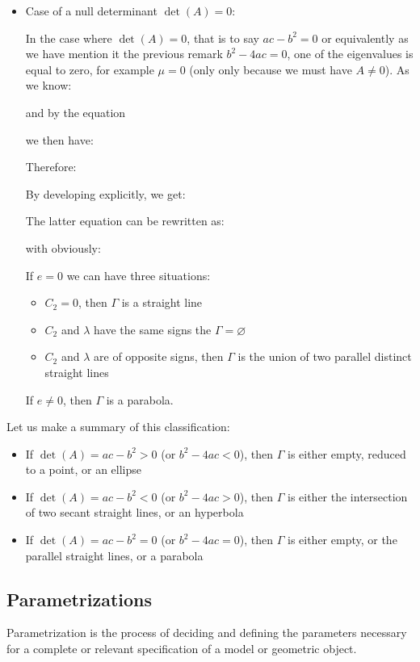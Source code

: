 \begin{itemize}
		\item Case of a null determinant $\det(A)=0$:
		
		In the case where $\det(A)=0$, that is to say $ac-b^2=0$ or equivalently as we have mention it the previous remark $b^2-4ac=0$, one of the eigenvalues is equal to zero, for example $\mu=0$ (only only because we must have $A\neq 0$). As we know:
		
		and by the equation
		
		we then have:
		
		Therefore:
		
		By developing explicitly, we get:
		
		The latter equation can be rewritten as:
		
		with obviously:
		
		If $e=0$ we can have three situations:
		\begin{itemize}
			\item $C_2=0$, then $\Gamma$ is a straight line

			\item $C_2$ and $\lambda$ have the same signs the $\Gamma=\varnothing$

			\item $C_2$ and $\lambda$ are of opposite signs, then $\Gamma$ is the union of two parallel distinct straight lines
		\end{itemize}
		If $e\neq 0$, then $\Gamma$ is a parabola.
	\end{itemize}
	Let us make a summary of this classification:
	\begin{itemize}
		\item If $\det(A)=ac-b^2>0$ (or $b^2-4ac<0$), then $\Gamma$ is either empty, reduced to a point, or an ellipse

		\item If $\det(A)=ac-b^2<0$ (or $b^2-4ac>0$), then $\Gamma$ is either the intersection of two secant straight lines, or an hyperbola

			\item If $\det(A)=ac-b^2=0$ (or $b^2-4ac=0$), then $\Gamma$ is either empty, or the parallel straight lines, or a parabola
	\end{itemize}	

	\pagebreak
	\subsection{Parametrizations}
	Parametrization  is the process of deciding and defining the parameters necessary for a complete or relevant specification of a model or geometric object.
	
